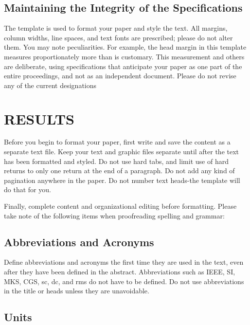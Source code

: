 \documentclass[letterpaper, 10 pt, conference]{ieeeconf}  %
\begin{document}
\subsection{Maintaining the Integrity of the Specifications}

The template is used to format your paper and style the text. All margins, column widths, line spaces, and text fonts are prescribed; please do not alter them. You may note peculiarities. For example, the head margin in this template measures proportionately more than is customary. This measurement and others are deliberate, using specifications that anticipate your paper as one part of the entire proceedings, and not as an independent document. Please do not revise any of the current designations

\section{RESULTS}

Before you begin to format your paper, first write and save the content as a separate text file. Keep your text and graphic files separate until after the text has been formatted and styled. Do not use hard tabs, and limit use of hard returns to only one return at the end of a paragraph. Do not add any kind of pagination anywhere in the paper. Do not number text heads-the template will do that for you.

Finally, complete content and organizational editing before formatting. Please take note of the following items when proofreading spelling and grammar:

\subsection{Abbreviations and Acronyms} Define abbreviations and acronyms the first time they are used in the text, even after they have been defined in the abstract. Abbreviations such as IEEE, SI, MKS, CGS, sc, dc, and rms do not have to be defined. Do not use abbreviations in the title or heads unless they are unavoidable.

\subsection{Units}
\end{document}
